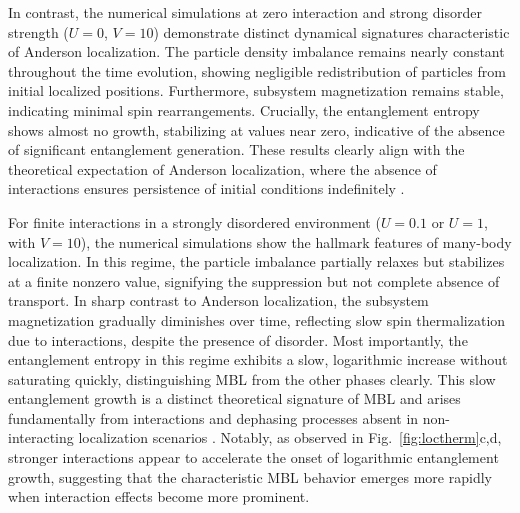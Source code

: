 In contrast, the numerical simulations at zero interaction and strong disorder strength ($U=0$, $V=10$) demonstrate distinct dynamical signatures characteristic of Anderson localization. The particle density imbalance remains nearly constant throughout the time evolution, showing negligible redistribution of particles from initial localized positions. Furthermore, subsystem magnetization remains stable, indicating minimal spin rearrangements. Crucially, the entanglement entropy shows almost no growth, stabilizing at values near zero, indicative of the absence of significant entanglement generation. These results clearly align with the theoretical expectation of Anderson localization, where the absence of interactions ensures persistence of initial conditions indefinitely \cite{anderson_absence_1958,abrahams_50_2010}.

For finite interactions in a strongly disordered environment ($U=0.1$ or $U=1$, with $V=10$), the numerical simulations show the hallmark features of many-body localization. In this regime, the particle imbalance partially relaxes but stabilizes at a finite nonzero value, signifying the suppression but not complete absence of transport. In sharp contrast to Anderson localization, the subsystem magnetization gradually diminishes over time, reflecting slow spin thermalization due to interactions, despite the presence of disorder. Most importantly, the entanglement entropy in this regime exhibits a slow, logarithmic increase without saturating quickly, distinguishing MBL from the other phases clearly. This slow entanglement growth is a distinct theoretical signature of MBL and arises fundamentally from interactions and dephasing processes absent in non-interacting localization scenarios \cite{basko_metalinsulator_2006,nandkishore_many-body_2015}. Notably, as observed in Fig.~\ref{fig:loctherm}c,d, stronger interactions appear to accelerate the onset of logarithmic entanglement growth, suggesting that the characteristic MBL behavior emerges more rapidly when interaction effects become more prominent.


